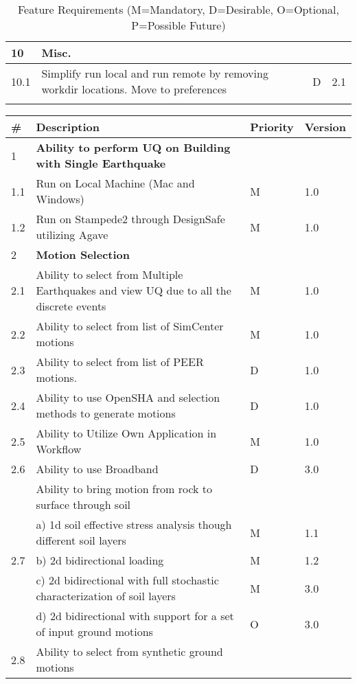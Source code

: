 {\begin{longtable}{| p{} | p{} | p{} | p{} |}
    10 & \textbf{Misc.} &  &  \\ \hline
	10.1 & Simplify run local and run remote by removing workdir locations. Move to preferences & D & 2.1  \\ \hline
    \bottomrule                                  
  \caption{Feature Requirements (M=Mandatory, D=Desirable, O=Optional, P=Possible Future)}             
  \label{tab:featureRequirements}                 
\end{longtable}
}{
\begin{longtable}{| p{} | p{} | p{} | p{} |}
    \toprule
      \# & Description & Priority & Version \\ \hline
      1 & \textbf{Ability to perform UQ on Building with Single Earthquake} &  &  \\ 
	1.1 & Run on Local Machine (Mac and Windows) & M & 1.0 \\ \hline
	1.2 & Run on Stampede2 through DesignSafe utilizing Agave & M & 1.0 \\ \hline
	2 & \textbf{Motion Selection} &  &  \\ \hline
	2.1 & Ability to select from Multiple Earthquakes and view UQ due to all the discrete events & M & 1.0  \\ \hline
	2.2 & Ability to select from list of SimCenter motions & M & 1.0 \\ \hline
	2.3 & Ability to select from list of PEER motions. & D & 1.0 \\ \hline
	2.4 & Ability to use OpenSHA and selection methods to generate motions & D & 1.0 \\ \hline
	2.5 & Ability to Utilize Own Application in Workflow & M & 1.0 \\ \hline
	2.6 & Ability to use Broadband & D & 3.0 \\ \hline
	\multirow{5}{*}{2.7} 
	& Ability to bring motion from rock to surface through soil &  &  \\ 
	 & a)     1d soil effective stress analysis though different soil layers & M & 1.1  \\ 
	 & b)     2d bidirectional loading & M & 1.2 \\ 
	 & c)     2d bidirectional with full stochastic characterization of soil layers & M & 3.0 \\
	 & d)     2d bidirectional with support for a set of input ground motions & O & 3.0 \\ 
	 \hline
	\multirow{5}{*}{2.8} 
	& Ability to select from synthetic ground motions &  &  \\

\end{longtable}}
